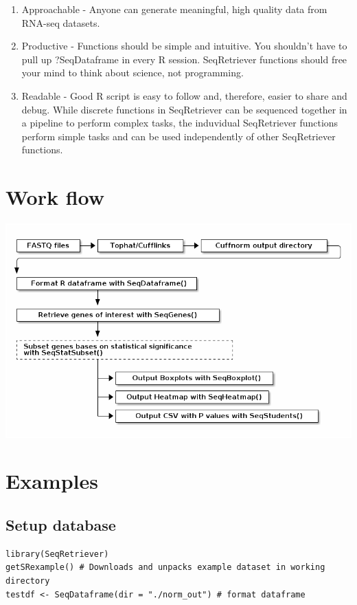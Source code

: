 \documentclass[11pt]{article}
\begin{document}
\begin{enumerate}
\item Approachable - Anyone can generate meaningful, high quality data from RNA-seq datasets.
\item Productive - Functions should be simple and intuitive. You shouldn't have to pull up ?SeqDataframe in every R session. SeqRetriever functions should free your mind to think about science, not programming.
\item Readable - Good R script is easy to follow and, therefore, easier to share and debug. While discrete functions in SeqRetriever can be sequenced together in a pipeline to perform complex tasks, the induvidual SeqRetriever functions perform simple tasks and can be used independently of other SeqRetriever functions.
\end{enumerate}

\section{Work flow}
\label{sec-3}
\includegraphics[width=.9\linewidth]{workflow.png}



\section{Examples}
\label{sec-4}

\subsection{Setup database}
\label{sec-4-1}
\begin{verbatim}
library(SeqRetriever)
getSRexample() # Downloads and unpacks example dataset in working directory
testdf <- SeqDataframe(dir = "./norm_out") # format dataframe
\end{verbatim}
\end{document}
